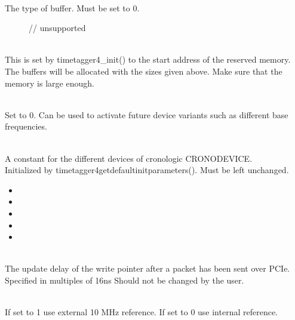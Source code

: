 			\\
			The type of buffer. Must be set to 0.
			\begin{description}
				\item[] 
				\item[]   // unsupported
			\end{description}

			\\
			This is set by timetagger4\_init() to the start address of the reserved memory.\\ 
			The buffers will be allocated with the sizes given above. Make sure that the memory is large enough.\par

			\\
			Set to 0. Can be used to activate future device variants such as different base frequencies.\par

			\\
			A constant for the different devices of cronologic \textsf{CRONO\tu DEVICE\tu *}.\\
			Initialized by \textsf{timetagger4\tu get\tu default\tu init\tu parameters()}. Must be left unchanged.
			\begin{itemize}
				\item[] 
				\item[] 
				\item[] 
				\item[] 
				\item[] 
			\end{itemize}

			\\
			The update delay of the write pointer after a packet has been sent over PCIe. Specified in multiples of 16ns
			Should not be changed by the user.\par

			\\
			If set to 1 use external 10 MHz reference. If set to 0 use internal reference.\par

